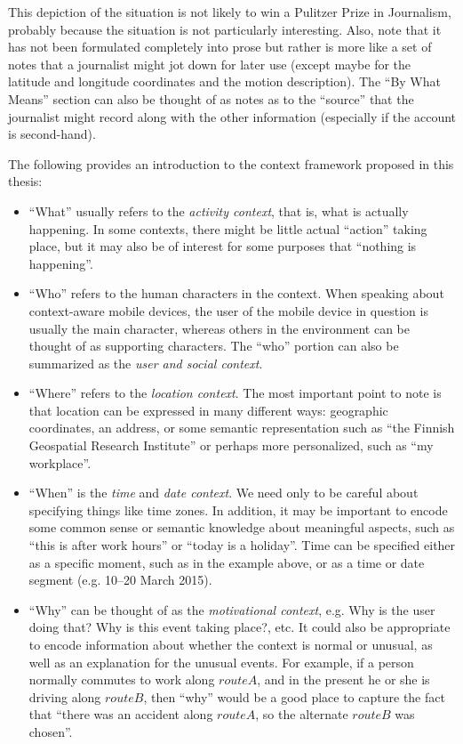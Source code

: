 This depiction of the situation is not likely to win a Pulitzer Prize in Journalism, probably because the situation is not particularly interesting. Also, note that it has not been formulated completely into prose but rather is more like a set of notes that a journalist might jot down for later use (except maybe for the latitude and longitude coordinates and the motion description). The ``By What Means'' section can also be thought of as notes as to the ``source'' that the journalist might record along with the other information (especially if the account is second-hand).

The following provides an introduction to the context framework proposed in this thesis:
%
\begin{itemize}
\item ``What'' usually refers to the \emph{activity context}, that is, what is actually happening. In some contexts, there might be little actual ``action'' taking place, but it may also be of interest for some purposes that ``nothing is happening''.
% 
\item ``Who'' refers to the human characters in the context. When speaking about context-aware mobile devices, the user of the mobile device in question is usually the main character, whereas others in the environment can be thought of as supporting characters. The ``who'' portion can also be summarized as the \emph{user and social context}. 
%
\item ``Where'' refers to the \emph{location context}. The most important point to note is that location can be expressed in many different ways: geographic coordinates, an address, or some semantic representation such as ``the Finnish Geospatial Research Institute'' or perhaps more personalized, such as ``my workplace''.
%
\item ``When'' is the \emph{time} and \emph{date context}. We need only to be careful about specifying things like time zones. In addition, it may be important to encode some common sense or semantic knowledge about meaningful aspects, such as ``this is after work hours'' or ``today is a holiday''. Time can be specified either as a specific moment, such as in the example above, or as a time or date segment (e.g. 10--20 March 2015).
%
\item ``Why'' can be thought of as the \emph{motivational context}, e.g. Why is the user doing that? Why is this event taking place?, etc. It could also be appropriate to encode information about whether the context is normal or unusual, as well as an explanation for the unusual events. For example, if a person normally commutes to work along $route A$, and in the present he or she is driving along $route B$, then ``why'' would be a good place to capture the fact that ``there was an accident along $route A$, so the alternate $route B$ was chosen''.

\end{itemize}
